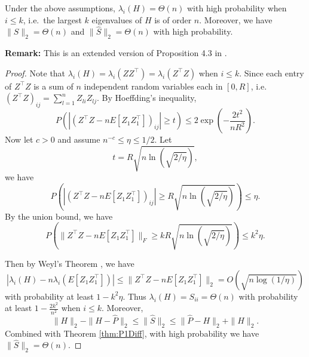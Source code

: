 \begin{lemma}
\label{lemma:eigSShatL1}
Under the above assumptions, $\lambda_i(H) = \Theta(n)$ with high probability when $i \le k$, i.e.\ the largest $k$ eigenvalues of $H$ is of order $n$. Moreover, we have $\| S \|_2 = \Theta(n)$ and $\| \hat{S} \|_2 = \Theta(n)$ with high probability.
\end{lemma}
\textbf{Remark:} This is an extended version of Proposition 4.3 in \citep{sussman2014consistent}. \\
\begin{proof}
Note that $\lambda_i(H) = \lambda_i(Z Z^{\top}) = \lambda_i(Z^{\top} Z)$ when $i \le k$. Since each entry of $Z^{\top} Z$ is a sum of $n$ independent random variables each in $[0, R]$, i.e. $(Z^{\top} Z)_{ij} = \sum_{l = 1}^n Z_{li} Z_{lj}$.
By Hoeffding's inequality,
\[
P(|(Z^{\top} Z - n E[Z_1 Z_1^{\top}])_{ij}| \ge t) \le 2 \exp(-\frac{2t^2}{n R^2}).
\]
Now let $c > 0$ and assume $n^{-c} \le \eta \le 1/2$. Let
\[
	t =  R \sqrt{n \ln(\sqrt{2/\eta})},
\]
we have
\[
P\left(|(Z^{\top} Z - n E[Z_1 Z_1^{\top}])_{ij}| \ge R \sqrt{n \ln(\sqrt{2/\eta})}\right) \le \eta.
\]
By the union bound, we have
\[
P\left(\|Z^{\top} Z - n E[Z_1 Z_1^{\top}]\|_F \ge k R \sqrt{n \ln(\sqrt{2/\eta})}\right) \le k^2 \eta.
\]

Then by Weyl's Theorem \citep{horn2012matrix}, we have
\[
|\lambda_i(H) - n \lambda_i(E[Z_1 Z_1^{\top}])| \le \|Z^{\top} Z - n E[Z_1 Z_1^{\top}]\|_2 = O(\sqrt{n\log{(1/\eta)}})
\]
with probability at least $1 - k^2 \eta$.
Thus $\lambda_i(H) = S_{ii} = \Theta(n)$ with probability at least $1 - \frac{2 k^2}{n^2}$ when $i \le k$.
Moreover,
\[
\| H \|_2 - \|H - \hat{P}\|_2 \le \|\hat{S}\|_2 \le \|\hat{P} - H\|_2 + \|H\|_2.
\]
Combined with Theorem \ref{thm:P1Diff}, with high probability we have $\|\hat{S}\|_2 = \Theta(n)$.
\end{proof}

